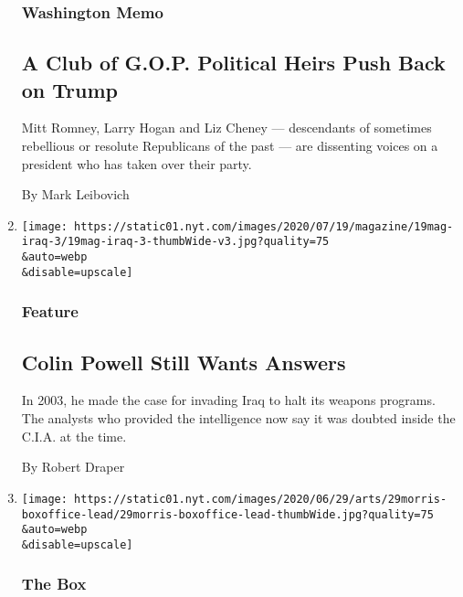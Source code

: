 \begin{enumerate}
  \hypertarget{washington-memo-1}{%
  \subsubsection{Washington Memo}\label{washington-memo-1}}

  \hypertarget{a-club-of-gop-political-heirs-push-back-on-trump}{%
  \subsection{A Club of G.O.P. Political Heirs Push Back on
  Trump}\label{a-club-of-gop-political-heirs-push-back-on-trump}}

  Mitt Romney, Larry Hogan and Liz Cheney --- descendants of sometimes
  rebellious or resolute Republicans of the past --- are dissenting
  voices on a president who has taken over their party.

  By Mark Leibovich
\item
  \href{/2020/07/16/magazine/colin-powell-iraq-war.html}{}

  \texttt{[image: https://static01.nyt.com/images/2020/07/19/magazine/19mag-iraq-3/19mag-iraq-3-thumbWide-v3.jpg?quality=75\\\&auto=webp\\\&disable=upscale]}

  \hypertarget{feature}{%
  \subsubsection{Feature}\label{feature}}

  \hypertarget{colin-powell-still-wants-answers}{%
  \subsection{Colin Powell Still Wants
  Answers}\label{colin-powell-still-wants-answers}}

  In 2003, he made the case for invading Iraq to halt its weapons
  programs. The analysts who provided the intelligence now say it was
  doubted inside the C.I.A. at the time.

  By Robert Draper
\item
  \href{/2020/06/30/movies/fahrenheit-911-movie-2004.html}{}

  \texttt{[image: https://static01.nyt.com/images/2020/06/29/arts/29morris-boxoffice-lead/29morris-boxoffice-lead-thumbWide.jpg?quality=75\\\&auto=webp\\\&disable=upscale]}

  \hypertarget{the-box}{%
  \subsubsection{The Box}\label{the-box}}


\end{enumerate}
